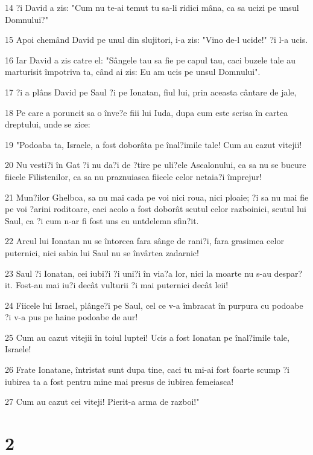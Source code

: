 \par 14 ?i David a zis: "Cum nu te-ai temut tu sa-li ridici mâna, ca sa ucizi pe unsul Domnului?"
\par 15 Apoi chemând David pe unul din slujitori, i-a zis: "Vino de-l ucide!" ?i l-a ucis.
\par 16 Iar David a zis catre el: "Sângele tau sa fie pe capul tau, caci buzele tale au marturisit împotriva ta, când ai zis: Eu am ucis pe unsul Domnului".
\par 17 ?i a plâns David pe Saul ?i pe Ionatan, fiul lui, prin aceasta cântare de jale,
\par 18 Pe care a poruncit sa o înve?e fiii lui Iuda, dupa cum este scrisa în cartea dreptului, unde se zice:
\par 19 "Podoaba ta, Israele, a fost doborâta pe înal?imile tale! Cum au cazut vitejii!
\par 20 Nu vesti?i în Gat ?i nu da?i de ?tire pe uli?ele Ascalonului, ca sa nu se bucure fiicele Filistenilor, ca sa nu praznuiasca fiicele celor netaia?i împrejur!
\par 21 Mun?ilor Ghelboa, sa nu mai cada pe voi nici roua, nici ploaie; ?i sa nu mai fie pe voi ?arini roditoare, caci acolo a fost doborât scutul celor razboinici, scutul lui Saul, ca ?i cum n-ar fi fost uns cu untdelemn sfin?it.
\par 22 Arcul lui Ionatan nu se întorcea fara sânge de rani?i, fara grasimea celor puternici, nici sabia lui Saul nu se învârtea zadarnic!
\par 23 Saul ?i Ionatan, cei iubi?i ?i uni?i în via?a lor, nici la moarte nu s-au despar?it. Fost-au mai iu?i decât vulturii ?i mai puternici decât leii!
\par 24 Fiicele lui Israel, plânge?i pe Saul, cel ce v-a îmbracat în purpura cu podoabe ?i v-a pus pe haine podoabe de aur!
\par 25 Cum au cazut vitejii în toiul luptei! Ucis a fost Ionatan pe înal?imile tale, Israele!
\par 26 Frate Ionatane, întristat sunt dupa tine, caci tu mi-ai fost foarte scump ?i iubirea ta a fost pentru mine mai presus de iubirea femeiasca!
\par 27 Cum au cazut cei viteji! Pierit-a arma de razboi!"

\chapter{2}


